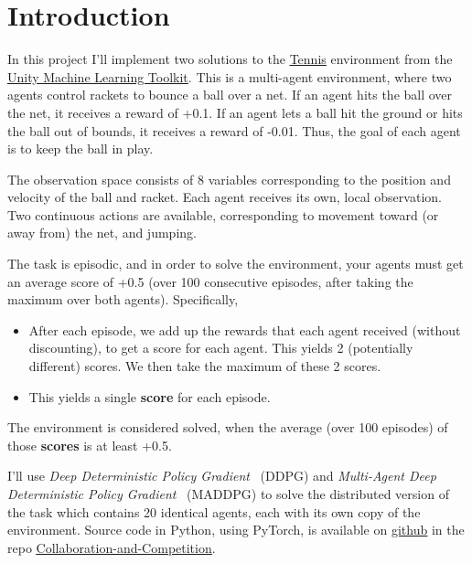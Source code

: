 \documentclass[sigchi]{acmart}
\begin{document}
\section{Introduction}

In this project I'll implement two solutions to the 
\href{https://github.com/Unity-Technologies/ml-agents/blob/master/docs/Learning-Environment-Examples.md#tennis}{\underline{Tennis}}
environment from the 
\href{https://unity3d.ai}{\underline{Unity Machine Learning Toolkit}}.
This is a multi-agent environment, where two agents control rackets to bounce a ball over a net. If an agent hits the ball over the net, it receives a reward of +0.1.  If an agent lets a ball hit the ground or hits the ball out of bounds, it receives a reward of -0.01.  Thus, the goal of each agent is to keep the ball in play.

The observation space consists of 8 variables corresponding to the position and velocity of the ball and racket. Each agent receives its own, local observation.  Two continuous actions are available, corresponding to movement toward (or away from) the net, and jumping. 

The task is episodic, and in order to solve the environment, your agents must get an average score of +0.5 (over 100 consecutive episodes, after taking the maximum over both agents). Specifically,
\begin{itemize}
	\item  After each episode, we add up the rewards that each agent received (without discounting), to get a score for each agent. This yields 2 (potentially different) scores. We then take the maximum of these 2 scores.
	\item  This yields a single \textbf{score} for each episode.
\end{itemize}
The environment is considered solved, when the average (over 100 episodes) of those \textbf{scores} is at least +0.5.



I'll use 
{\em Deep Deterministic Policy Gradient}~\cite{Silver:2014:DPG:3044805.3044850} (DDPG) 
and
{\em Multi-Agent Deep Deterministic Policy Gradient}~\cite{DBLP:journals/corr/LoweWTHAM17} (MADDPG) 
to solve the distributed version of the task which contains 20 identical agents, each with its own copy of the environment.
Source code in Python, using PyTorch, is available on 
\href{http://github.com}{\underline{github}} 
in the repo 
\href{https://github.com/bobflagg/Collaboration-and-Competition}{\underline{Collaboration-and-Competition}}.
\end{document}
